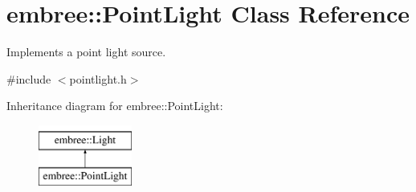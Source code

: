 \hypertarget{classembree_1_1_point_light}{
\section{embree::PointLight Class Reference}
\label{classembree_1_1_point_light}
}


Implements a point light source.  




{\ttfamily \#include $<$pointlight.h$>$}

Inheritance diagram for embree::PointLight:\begin{figure}[H]
\begin{center}
\leavevmode
\includegraphics[height=2.000000cm]{classembree_1_1_point_light}
\end{center}
\end{figure}
